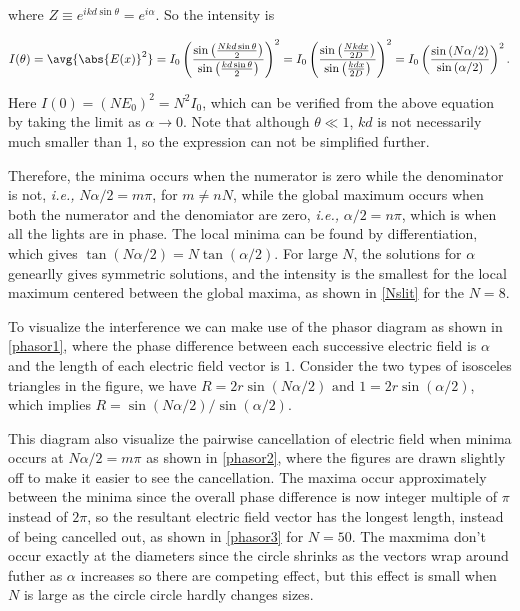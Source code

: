\documentclass[english,a4paper,12pt]{report}
\begin{document}
where \(Z \equiv e^{ikd\sin \theta } = e^{i\alpha }   \). So the intensity is 

\begin{equation}
    I(\theta ) = \avg{\abs{E(x)}^2 } = I_0 \left( \frac{\sin \left( \frac{Nkd\sin \theta }{2}  \right)}{\sin \left( \frac{kd\sin \theta }{2}  \right)}  \right)^2 = I_0 \left( \frac{\sin \left( \frac{Nkdx}{2D}  \right)}{\sin \left( \frac{kdx}{2D}  \right)}  \right)^2 = I_0 \left( \frac{\sin \left(N\alpha /2 \right)}{\sin \left(\alpha /2  \right)}  \right)^2. \label{Nslits} 
\end{equation}

Here \(I (0) = (NE_0 )^2 = N^2I_0 \), which can be verified from the above equation by taking the limit as \(\alpha \to 0\). Note that although \(\theta \ll 1\), \(kd\) is not necessarily much smaller than 1, so the expression can not be simplified further. 

Therefore, the minima occurs when the numerator is zero while the denominator is not, \textit{i.e.,} \(N \alpha /2 = m\pi \), for \(m \neq nN\), while the global maximum occurs when both the numerator and the denomiator are zero, \textit{i.e.,} \(\alpha /2 = n\pi \), which is when all the lights are in phase. The local minima can be found by differentiation, which gives \(\tan (N\alpha /2) = N\tan (\alpha /2)\). For large \(N\), the solutions for \(\alpha \) genearlly gives symmetric solutions, and the intensity is the smallest for the local maximum centered between the global maxima, as shown in \cref{Nslit} for the \(N=8\).


To visualize the interference we can make use of the phasor diagram as shown in \cref{phasor1}, where the phase difference between each successive electric field is \(\alpha \) and the length of each electric field vector is \(1\). Consider the two types of isosceles triangles in the figure, we have \(R = 2r \sin (N \alpha /2) \text { and } 1 = 2r \sin (\alpha /2)\), which implies \(R = \sin (N \alpha /2)/\sin (\alpha /2)\). 

This diagram also visualize the pairwise cancellation of electric field when minima occurs at \(N \alpha /2 = m\pi \) as shown in \cref{phasor2}, where the figures are drawn slightly off to make it easier to see the cancellation. The maxima occur approximately between the minima since the overall phase difference is now integer multiple of \(\pi \) instead of \(2\pi \), so the resultant electric field vector has the longest length, instead of being cancelled out, as shown in \cref{phasor3} for \(N= 50\). The maxmima don't occur exactly at the diameters since the circle shrinks as the vectors wrap around futher as \(\alpha \) increases so there are competing effect, but this effect is small when \(N\) is large as the circle circle hardly changes sizes.  
\end{document}
